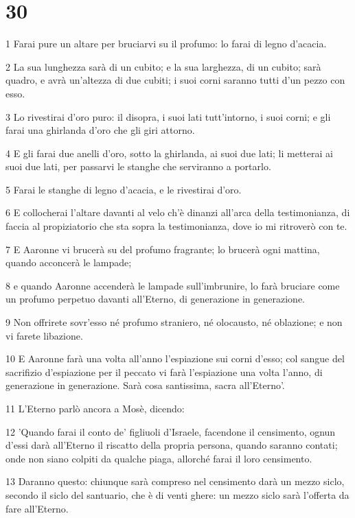 \chapter{30}

\par 1 Farai pure un altare per bruciarvi su il profumo: lo farai di legno d'acacia.
\par 2 La sua lunghezza sarà di un cubito; e la sua larghezza, di un cubito; sarà quadro, e avrà un'altezza di due cubiti; i suoi corni saranno tutti d'un pezzo con esso.
\par 3 Lo rivestirai d'oro puro: il disopra, i suoi lati tutt'intorno, i suoi corni; e gli farai una ghirlanda d'oro che gli giri attorno.
\par 4 E gli farai due anelli d'oro, sotto la ghirlanda, ai suoi due lati; li metterai ai suoi due lati, per passarvi le stanghe che serviranno a portarlo.
\par 5 Farai le stanghe di legno d'acacia, e le rivestirai d'oro.
\par 6 E collocherai l'altare davanti al velo ch'è dinanzi all'arca della testimonianza, di faccia al propiziatorio che sta sopra la testimonianza, dove io mi ritroverò con te.
\par 7 E Aaronne vi brucerà su del profumo fragrante; lo brucerà ogni mattina, quando acconcerà le lampade;
\par 8 e quando Aaronne accenderà le lampade sull'imbrunire, lo farà bruciare come un profumo perpetuo davanti all'Eterno, di generazione in generazione.
\par 9 Non offrirete sovr'esso né profumo straniero, né olocausto, né oblazione; e non vi farete libazione.
\par 10 E Aaronne farà una volta all'anno l'espiazione sui corni d'esso; col sangue del sacrifizio d'espiazione per il peccato vi farà l'espiazione una volta l'anno, di generazione in generazione. Sarà cosa santissima, sacra all'Eterno'.
\par 11 L'Eterno parlò ancora a Mosè, dicendo:
\par 12 'Quando farai il conto de' figliuoli d'Israele, facendone il censimento, ognun d'essi darà all'Eterno il riscatto della propria persona, quando saranno contati; onde non siano colpiti da qualche piaga, allorché farai il loro censimento.
\par 13 Daranno questo: chiunque sarà compreso nel censimento darà un mezzo siclo, secondo il siclo del santuario, che è di venti ghere: un mezzo siclo sarà l'offerta da fare all'Eterno.
